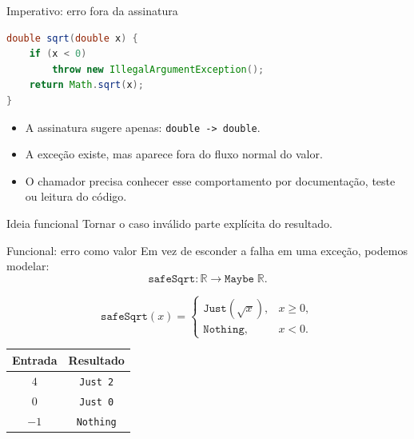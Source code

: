 \documentclass[aspectratio=169,11pt]{beamer}
\begin{document}
\begin{frame}[fragile]{Imperativo: erro fora da assinatura}
  \begin{lstlisting}[language=Java]
double sqrt(double x) {
    if (x < 0)
        throw new IllegalArgumentException();
    return Math.sqrt(x);
}
  \end{lstlisting}

  \begin{itemize}
    \item A assinatura sugere apenas: \texttt{double -> double}.
    \item A exceção existe, mas aparece fora do fluxo normal do valor.
    \item O chamador precisa conhecer esse comportamento por documentação, teste ou leitura do código.
  \end{itemize}

  \begin{block}{Ideia funcional}
    Tornar o caso inválido parte explícita do resultado.
  \end{block}
\end{frame}

\begin{frame}{Funcional: erro como valor}
  Em vez de esconder a falha em uma exceção, podemos modelar:
  \begin{equation*}
    \texttt{safeSqrt}:\mathbb{R}\longrightarrow \texttt{Maybe}\;\mathbb{R}.
  \end{equation*}

  \begin{equation*}
    \texttt{safeSqrt}(x)=
    \begin{cases}
      \texttt{Just}(\sqrt{x}), & x\geq 0,\\
      \texttt{Nothing}, & x<0.
    \end{cases}
  \end{equation*}

  \begin{center}
    \begin{tabular}{c|c}
      \toprule
      Entrada & Resultado \\
      \midrule
      $4$ & \texttt{Just 2} \\
      $0$ & \texttt{Just 0} \\
      $-1$ & \texttt{Nothing} \\
      \bottomrule
    \end{tabular}
  \end{center}
\end{frame}
\end{document}
